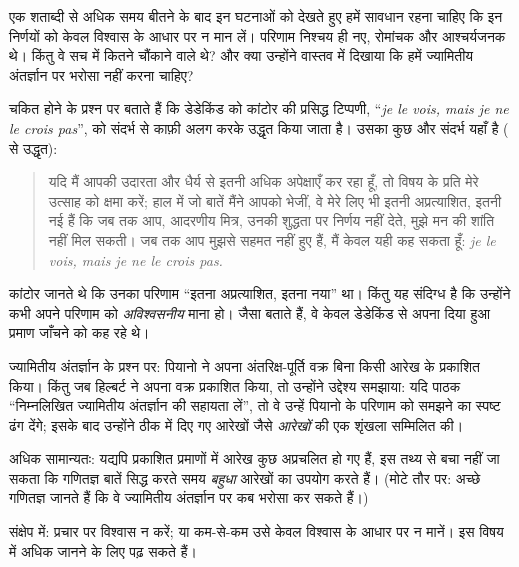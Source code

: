 \documentclass[../../../include/open-logic-section]{subfiles}
\begin{document}


एक शताब्दी से अधिक समय बीतने के बाद इन घटनाओं को देखते हुए हमें सावधान रहना
चाहिए कि इन निर्णयों को केवल विश्वास के आधार पर न मान लें। परिणाम निश्चय ही
नए, रोमांचक और आश्चर्यजनक थे। किंतु वे सच में कितने चौंकाने वाले थे? और क्या
उन्होंने वास्तव में दिखाया कि हमें ज्यामितीय अंतर्ज्ञान पर भरोसा नहीं करना
चाहिए?

चकित होने के प्रश्न पर \citet{Gouvea2011} बताते हैं कि डेडेकिंड को कांटोर की
प्रसिद्ध टिप्पणी, ``\emph{je le vois, mais je ne le crois pas}'', को संदर्भ
से काफ़ी अलग करके उद्धृत किया जाता है। उसका कुछ और संदर्भ यहाँ है
(\citeauthor{Gouvea2011} से उद्धृत):
\begin{quote}
यदि मैं आपकी उदारता और धैर्य से इतनी अधिक अपेक्षाएँ कर रहा हूँ, तो विषय के
प्रति मेरे उत्साह को क्षमा करें; हाल में जो बातें मैंने आपको भेजीं, वे मेरे
लिए भी इतनी अप्रत्याशित, इतनी नई हैं कि जब तक आप, आदरणीय मित्र, उनकी शुद्धता
पर निर्णय नहीं देते, मुझे मन की शांति नहीं मिल सकती। जब तक आप मुझसे सहमत
नहीं हुए हैं, मैं केवल यही कह सकता हूँ: \emph{je le vois, mais je ne le
crois pas.}
\end{quote}
कांटोर जानते थे कि उनका परिणाम ``इतना अप्रत्याशित, इतना नया'' था। किंतु यह
संदिग्ध है कि उन्होंने कभी अपने परिणाम को \emph{अविश्वसनीय} माना हो। जैसा
\citeauthor{Gouvea2011} बताते हैं, वे केवल डेडेकिंड से अपना दिया हुआ प्रमाण
जाँचने को कह रहे थे।

ज्यामितीय अंतर्ज्ञान के प्रश्न पर: पियानो ने अपना अंतरिक्ष-पूर्ति वक्र बिना
किसी आरेख के प्रकाशित किया। किंतु जब हिल्बर्ट ने अपना वक्र प्रकाशित किया, तो
उन्होंने उद्देश्य समझाया: यदि पाठक ``निम्नलिखित ज्यामितीय अंतर्ज्ञान की सहायता
लें'', तो वे उन्हें पियानो के परिणाम को समझने का स्पष्ट ढंग देंगे; इसके बाद
उन्होंने ठीक  में दिए गए आरेखों जैसे
\emph{आरेखों} की एक शृंखला सम्मिलित की।

अधिक सामान्यतः: यद्यपि प्रकाशित प्रमाणों में आरेख कुछ अप्रचलित हो गए हैं, इस
तथ्य से बचा नहीं जा सकता कि गणितज्ञ बातें सिद्ध करते समय \emph{बहुधा} आरेखों
का उपयोग करते हैं। (मोटे तौर पर: अच्छे गणितज्ञ जानते हैं कि वे ज्यामितीय
अंतर्ज्ञान पर कब भरोसा कर सकते हैं।)

संक्षेप में: प्रचार पर विश्वास न करें; या कम-से-कम उसे केवल विश्वास के आधार
पर न मानें। इस विषय में अधिक जानने के लिए \citet{Giaquinto2007} पढ़ सकते
हैं।
\end{document}

